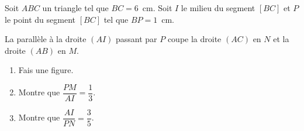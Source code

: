 
Soit $ABC$ un triangle tel que $BC=6$~cm. Soit $I$ le milieu du segment
$[BC]$ et $P$ le point du segment $[BC]$ tel que $BP=1$~cm.\par La
parallèle à la droite $(AI)$ passant par $P$ coupe la droite $(AC)$ en
$N$ et la droite $(AB)$ en $M$.
\begin{enumerate}
\item Fais une figure.
\item Montre que $\dfrac{PM}{AI}=\dfrac13$.
\item Montre que $\dfrac{AI}{PN}=\dfrac35$.
\end{enumerate}
